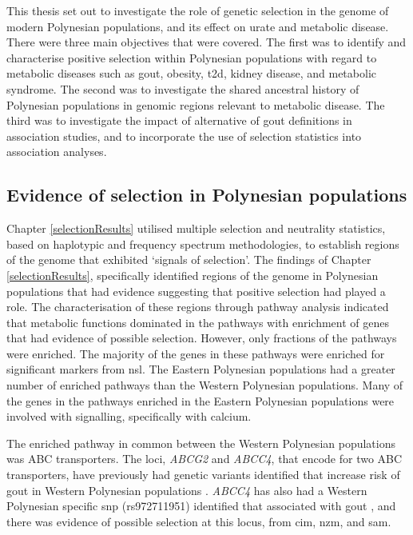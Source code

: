 \documentclass[twoside,openright]{report}
\begin{document}
This thesis set out to investigate the role of genetic selection in the
genome of modern Polynesian populations, and its effect on urate and
metabolic disease. There were three main objectives that were covered.
The first was to identify and characterise positive selection within
Polynesian populations with regard to metabolic diseases such as gout,
obesity, \gls{t2d}, kidney disease, and metabolic syndrome. The second
was to investigate the shared ancestral history of Polynesian
populations in genomic regions relevant to metabolic disease. The third
was to investigate the impact of alternative of gout definitions in
association studies, and to incorporate the use of selection statistics
into association analyses.

\subsection{Evidence of selection in Polynesian
populations}\label{evidence-of-selection-in-polynesian-populations}

Chapter \ref{selectionResults} utilised multiple selection and
neutrality statistics, based on haplotypic and frequency spectrum
methodologies, to establish regions of the genome that exhibited
`signals of selection'. The findings of Chapter \ref{selectionResults},
specifically identified regions of the genome in Polynesian populations
that had evidence suggesting that positive selection had played a role.
The characterisation of these regions through pathway analysis indicated
that metabolic functions dominated in the pathways with enrichment of
genes that had evidence of possible selection. However, only fractions
of the pathways were enriched. The majority of the genes in these
pathways were enriched for significant markers from \gls{nsl}. The
Eastern Polynesian populations had a greater number of enriched pathways
than the Western Polynesian populations. Many of the genes in the
pathways enriched in the Eastern Polynesian populations were involved
with signalling, specifically with calcium.

The enriched pathway in common between the Western Polynesian
populations was ABC transporters. The loci, \emph{ABCG2} and
\emph{ABCC4}, that encode for two ABC transporters, have previously had
genetic variants identified that increase risk of gout in Western
Polynesian populations \citep{Phipps-Green2010, Tanner2017}.
\emph{ABCC4} has also had a Western Polynesian specific \gls{snp}
(rs972711951) identified that associated with gout \citep{Tanner2017},
and there was evidence of possible selection at this locus, from
\gls{cim}, \gls{nzm}, and \gls{sam}.
\end{document}
